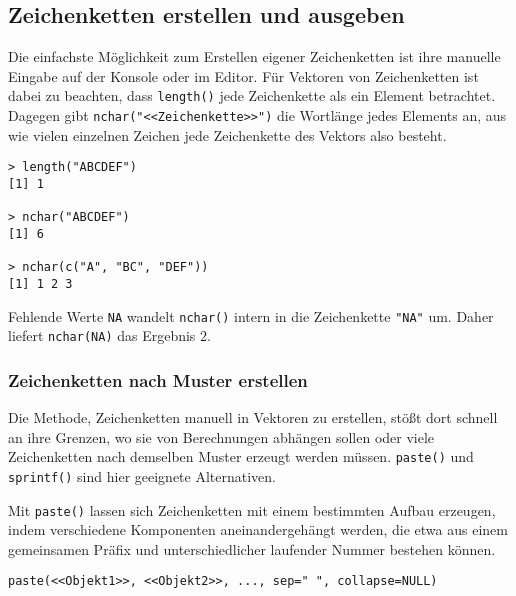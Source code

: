 \subsection{Zeichenketten erstellen und ausgeben}
\label{sec:strings}

Die einfachste Möglichkeit zum Erstellen eigener Zeichenketten ist ihre manuelle Eingabe auf der Konsole oder im Editor. Für Vektoren von Zeichenketten ist dabei zu beachten, dass \lstinline!length()! jede Zeichenkette als ein Element betrachtet. Dagegen gibt \lstinline!nchar("<<Zeichenkette>>")! die Wortlänge jedes Elements an, aus wie vielen einzelnen Zeichen jede Zeichenkette des Vektors also besteht.
\begin{lstlisting}
> length("ABCDEF")
[1] 1

> nchar("ABCDEF")
[1] 6

> nchar(c("A", "BC", "DEF"))
[1] 1 2 3
\end{lstlisting}

Fehlende Werte \lstinline!NA! wandelt \lstinline!nchar()! intern in die Zeichenkette \lstinline!"NA"! um. Daher liefert \lstinline!nchar(NA)! das Ergebnis $2$.

\subsubsection{Zeichenketten nach Muster erstellen}

Die Methode, Zeichenketten manuell in Vektoren zu erstellen, stößt dort schnell an ihre Grenzen, wo sie von Berechnungen abhängen sollen oder viele Zeichenketten nach demselben Muster erzeugt werden müssen. \lstinline!paste()! und \lstinline!sprintf()! sind hier geeignete Alternativen.


Mit \lstinline!paste()! lassen sich Zeichenketten mit einem bestimmten Aufbau erzeugen, indem verschiedene Komponenten aneinandergehängt werden, die etwa aus einem gemeinsamen Präfix und unterschiedlicher laufender Nummer bestehen können.
\begin{lstlisting}
paste(<<Objekt1>>, <<Objekt2>>, ..., sep=" ", collapse=NULL)
\end{lstlisting}

